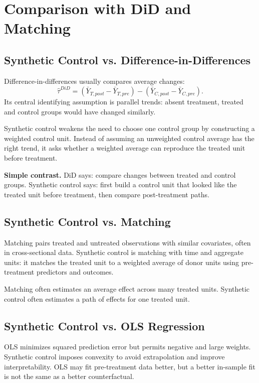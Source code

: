 \section{Comparison with DiD and Matching}

\subsection{Synthetic Control vs. Difference-in-Differences}

Difference-in-differences usually compares average changes:
\[
\widehat{\tau}^{DiD}
=
(\bar{Y}_{T,post}-\bar{Y}_{T,pre})
-
(\bar{Y}_{C,post}-\bar{Y}_{C,pre}).
\]
Its central identifying assumption is parallel trends: absent treatment, treated and control groups would have changed similarly.

Synthetic control weakens the need to choose one control group by constructing a weighted control unit. Instead of assuming an unweighted control average has the right trend, it asks whether a weighted average can reproduce the treated unit before treatment.

\begin{boxD}
\textbf{Simple contrast.} DiD says: compare changes between treated and control groups. Synthetic control says: first build a control unit that looked like the treated unit before treatment, then compare post-treatment paths.
\end{boxD}

\subsection{Synthetic Control vs. Matching}

Matching pairs treated and untreated observations with similar covariates, often in cross-sectional data. Synthetic control is matching with time and aggregate units: it matches the treated unit to a weighted average of donor units using pre-treatment predictors and outcomes.

Matching often estimates an average effect across many treated units. Synthetic control often estimates a path of effects for one treated unit.

\subsection{Synthetic Control vs. OLS Regression}

OLS minimizes squared prediction error but permits negative and large weights. Synthetic control imposes convexity to avoid extrapolation and improve interpretability. OLS may fit pre-treatment data better, but a better in-sample fit is not the same as a better counterfactual.

